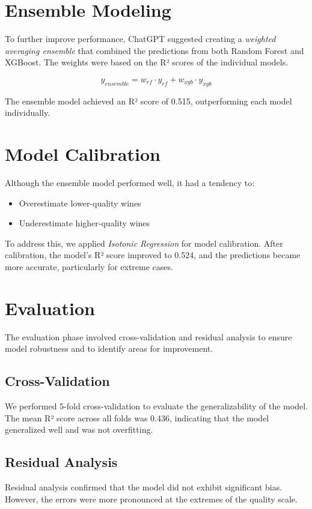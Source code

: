 \documentclass{article}
\begin{document}
\section{Ensemble Modeling}
To further improve performance, ChatGPT suggested creating a \textit{weighted averaging ensemble} that combined the predictions from both Random Forest and XGBoost. The weights were based on the R² scores of the individual models.

\begin{equation}
y_{ensemble} = w_{rf} \cdot y_{rf} + w_{xgb} \cdot y_{xgb}
\end{equation}

The ensemble model achieved an R² score of 0.515, outperforming each model individually.

\section{Model Calibration}
Although the ensemble model performed well, it had a tendency to:
\begin{itemize}
    \item Overestimate lower-quality wines
    \item Underestimate higher-quality wines
\end{itemize}

To address this, we applied \textit{Isotonic Regression} for model calibration. After calibration, the model’s R² score improved to 0.524, and the predictions became more accurate, particularly for extreme cases.

\section{Evaluation}
The evaluation phase involved cross-validation and residual analysis to ensure model robustness and to identify areas for improvement.

\subsection{Cross-Validation}
We performed 5-fold cross-validation to evaluate the generalizability of the model. The mean R² score across all folds was 0.436, indicating that the model generalized well and was not overfitting.

\subsection{Residual Analysis}
Residual analysis confirmed that the model did not exhibit significant bias. However, the errors were more pronounced at the extremes of the quality scale.
\end{document}

